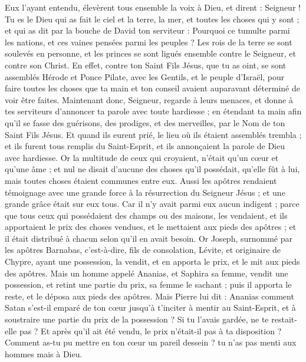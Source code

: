 \begin{multicols}{2}
{Eux l'ayant entendu, élevèrent tous ensemble la voix à Dieu, et dirent : Seigneur ! Tu es le Dieu qui as fait le ciel et la terre, la mer, et toutes les choses qui y sont ;
et qui as dit par la bouche de David ton serviteur : Pourquoi ce tumulte parmi les nations, et ces vaines pensées parmi les peuples ?
Les rois de la terre se sont soulevés en personne, et les princes se sont ligués ensemble contre le Seigneur, et contre son Christ.
En effet, contre ton Saint Fils Jésus, que tu as oint, se sont assemblés Hérode et Ponce Pilate, avec les Gentils, et le peuple d'Israël,
pour faire toutes les choses que ta main et ton conseil avaient auparavant déterminé de voir être faites.
Maintenant donc, Seigneur, regarde à leurs menaces, et donne à tes serviteurs d'annoncer ta parole avec toute hardiesse ;
en étendant ta main afin qu'il se fasse des guérisons, des prodiges, et des merveilles, par le Nom de ton Saint Fils Jésus.
Et quand ils eurent prié, le lieu où ils étaient assemblés trembla ; et ils furent tous remplis du Saint-Esprit, et ils annonçaient la parole de Dieu avec hardiesse.
Or la multitude de ceux qui croyaient, n'était qu'un cœur et qu'une âme ; et nul ne disait d'aucune des choses qu'il possédait, qu'elle fût à lui, mais toutes choses étaient communes entre eux.
Aussi les apôtres rendaient témoignage avec une grande force à la résurrection du Seigneur Jésus ; et une grande grâce était sur eux tous.
Car il n'y avait parmi eux aucun indigent ; parce que tous ceux qui possédaient des champs ou des maisons, les vendaient, et ils apportaient le prix des choses vendues,
et le mettaient aux pieds des apôtres ; et il était distribué à chacun selon qu'il en avait besoin.
Or Joseph, surnommé par les apôtres Barnabas, c'est-à-dire, fils de consolation, Lévite, et originaire de Chypre,
ayant une possession, la vendit, et en apporta le prix, et le mit aux pieds des apôtres.
\VerseOne{}Mais un homme appelé Ananias, et Saphira sa femme, vendit une possession,
et retint une partie du prix, sa femme le sachant ; puis il apporta le reste, et le déposa aux pieds des apôtres.
Mais Pierre lui dit : Ananias comment Satan s'est-il emparé de ton cœur jusqu'à t'inciter à mentir au Saint-Esprit, et à soustraire une partie du prix de la possession ?
Si tu l'avais gardée, ne te restait-elle pas ? Et après qu'il ait été vendu, le prix n'était-il pas à ta disposition ? Comment as-tu pu mettre en ton cœur un pareil dessein ? tu n'as pas menti aux hommes mais à Dieu.
}
\end{multicols}
